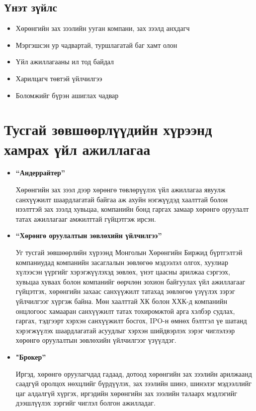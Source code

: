 \subsection{Үнэт зүйлс}
\begin{itemize}
    \item Хөрөнгийн зах зээлийн ууган компани, зах зээлд анхдагч
    \item Мэргэшсэн ур чадвартай, туршлагатай баг хамт олон
    \item Үйл ажиллагааны ил тод байдал
    \item Харилцагч төвтэй үйлчилгээ
    \item Боломжийг бүрэн ашиглах чадвар
\end{itemize}
\section{Тусгай зөвшөөрлүүдийн хүрээнд хамрах үйл ажиллагаа}
\begin{itemize}
    \item \textbf{“Андеррайтер”} \par
    Хөрөнгийн зах зээл дээр хөрөнгө төвлөрүүлэх үйл ажиллагаа явуулж санхүүжилт шаардлагатай байгаа аж ахуйн нэгжүүдэд хаалттай болон нээлттэй зах зээлд хувьцаа, компанийн бонд гаргах замаар хөрөнгө оруулалт татах ажиллагааг амжилттай гүйцэтгэж ирсэн.
    \item \textbf{“Хөрөнгө оруулалтын зөвлөхийн үйлчилгээ”} \par
    Уг тусгай зөвшөөрлийн хүрээнд Монголын Хөрөнгийн Биржид бүртгэлтэй компаниудад компанийн засаглалын зөвлөгөө мэдээлэл олгох, хуулиар хүлээсэн үүргийг хэрэгжүүлэхэд зөвлөх, үнэт цаасны арилжаа сэргээх, хувьцаа хуваах болон компанийг өөрчлөн зохион байгуулах үйл ажиллагааг гүйцэтгэх, хөрөнгийн захаас санхүүжилт татахад зөвлөгөө үзүүлэх зэрэг үйлчилгээг хүргэж байна. Мөн хаалттай ХК болон ХХК-д компанийн онцлогоос хамааран санхүүжилт татах тохиромжтой арга хэлбэр судлах, гаргах, тэдгээрт хэрхэн санхүүжилт босгох, IPO-н өмнөх бэлтгэл үе шатанд хэрэгжүүлэх шаардлагатай асуудлыг хэрхэн шийдвэрлэх зэрэг чиглэлээр хөрөнгө оруулалтын зөвлөхийн үйлчилгээг үзүүлдэг.
    \item \textbf{"Брокер”} \par
    Иргэд, хөрөнгө оруулагчдад гадаад, дотоод хөрөнгийн зах зээлийн арилжаанд саадгүй оролцох нөхцлийг бүрдүүлэх, зах зээлийн шинэ, шинэлэг мэдээллийг цаг алдалгүй хүргэх, иргэдийн хөрөнгийн зах зээлийн талаарх мэдлэгийг дээшлүүлэх зэргийг чиглэл болгон ажилладаг.

\end{itemize}
